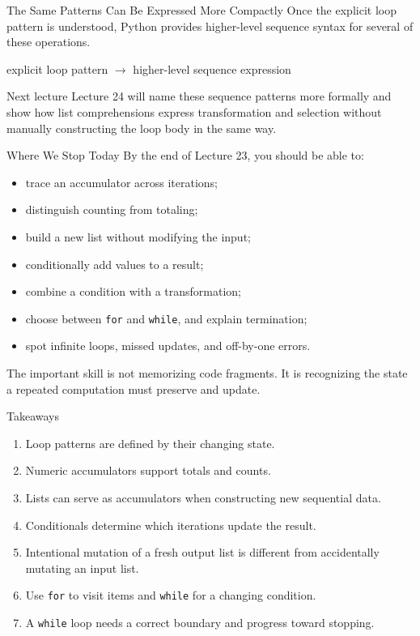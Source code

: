 \documentclass[aspectratio=169,10pt]{beamer}
\begin{document}
\begin{frame}{The Same Patterns Can Be Expressed More Compactly}
  Once the explicit loop pattern is understood, Python provides higher-level sequence syntax for several of these operations.

  \begin{center}
    explicit loop pattern $\rightarrow$ higher-level sequence expression
  \end{center}

  \begin{alertblock}{Next lecture}
    Lecture 24 will name these sequence patterns more formally and show how list comprehensions express transformation and selection without manually constructing the loop body in the same way.
  \end{alertblock}
\end{frame}

\begin{frame}{Where We Stop Today}
  By the end of Lecture 23, you should be able to:

  \begin{itemize}
    \item trace an accumulator across iterations;
    \item distinguish counting from totaling;
    \item build a new list without modifying the input;
    \item conditionally add values to a result;
    \item combine a condition with a transformation;
    \item choose between \texttt{for} and \texttt{while}, and explain termination;
    \item spot infinite loops, missed updates, and off-by-one errors.
  \end{itemize}

  \begin{keyidea}
    The important skill is not memorizing code fragments. It is recognizing the state a repeated computation must preserve and update.
  \end{keyidea}
\end{frame}

\begin{frame}{Takeaways}
  \begin{enumerate}
    \item Loop patterns are defined by their changing state.
    \item Numeric accumulators support totals and counts.
    \item Lists can serve as accumulators when constructing new sequential data.
    \item Conditionals determine which iterations update the result.
    \item Intentional mutation of a fresh output list is different from accidentally mutating an input list.
    \item Use \texttt{for} to visit items and \texttt{while} for a changing condition.
    \item A \texttt{while} loop needs a correct boundary and progress toward stopping.
  \end{enumerate}
\end{frame}
\end{document}
